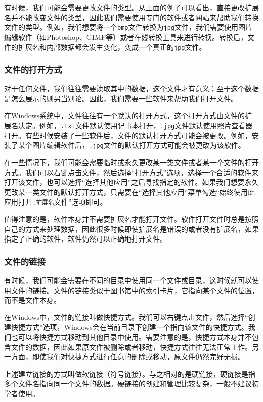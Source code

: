 有时候，我们可能会需要更改文件的类型。从上面的例子可以看出，直接更改扩展名并不能改变文件的类型，因此我们需要使用专门的软件或者网站来帮助我们转换文件的类型。例如，我们想要将一个\texttt{bmp}文件转换为\texttt{jpg}文件，我们需要使用图片编辑软件（如Photoshop、GIMP等）或者在线转换工具来进行转换。转换后，文件的扩展名和内部数据都会发生变化，变成一个真正的\texttt{jpg}文件。

\subsubsection{文件的打开方式}

对于任何文件，我们往往需要读取其中的数据，这个文件才有意义；至于这个数据是怎么展示的则另当别论。因此，我们需要一些软件来帮助我们打开文件。

在Windows系统中，文件往往有一个默认的打开方式，这个打开方式由文件的扩展名决定。例如，\texttt{.txt}文件默认使用记事本打开，\texttt{.jpg}文件默认使用照片查看器打开。有些时候安装了一些软件后，文件的默认打开方式可能会被更改。例如，安装了某个图片编辑软件后，\texttt{.jpg}文件的默认打开方式可能会被更改为该软件。

在一些情况下，我们可能会需要临时或永久更改某一类文件或者某一个文件的打开方式。我们可以右键点击文件，然后选择“打开方式”选项，选择一个合适的软件来打开该文件，也可以选择“选择其他应用”之后寻找指定的软件。如果我们想要永久更改某一类文件的默认打开方式，只需要在“选择其他应用”菜单勾选“始终使用此应用打开\texttt{.扩展名}文件”选项即可。

值得注意的是，软件本身并不需要扩展名才能打开文件。软件打开文件时总是按照自己的方式来处理数据，因此很多时候即使扩展名是错误的或者没有扩展名，如果指定了正确的软件，软件仍然可以正确地打开文件。

\subsubsection{文件的链接}

有时候，我们可能会需要在不同的目录中使用同一个文件或目录，这时候就可以使用文件的链接。文件的链接类似于图书馆中的索引卡片，它指向某个文件的位置，而不是文件本身。

在Windows中，文件的链接叫做快捷方式。我们可以右键点击文件，然后选择“创建快捷方式”选项，Windows会在当前目录下创建一个指向该文件的快捷方式。我们也可以将快捷方式移动到其他目录中使用。需要注意的是，快捷方式本身并不包含文件的数据，因此如果原文件被删除或者移动，快捷方式往往无法正常工作。另一方面，即使我们对快捷方式进行任意的删除或移动，原文件仍然完好无损。

上述建立链接的方式叫做软链接（符号链接）。与之相对的是硬链接，硬链接是指多个文件名指向同一个文件的数据。硬链接的创建和管理比较复杂，一般不建议初学者使用。

